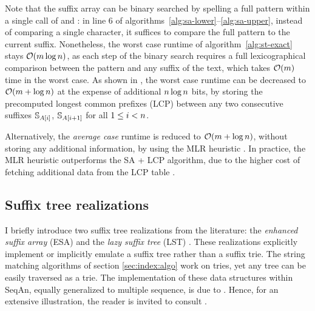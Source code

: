 Note that the suffix array can be binary searched by spelling a full pattern within a single call of  and : in line 6 of algorithms~\ref{alg:sa-lower}--\ref{alg:sa-upper}, instead of comparing a single character, it suffices to compare the full pattern to the current suffix.
Nonetheless, the worst case runtime of algorithm~\ref{alg:st-exact} stays $\mathcal{O}(m \log{n})$, as each step of the binary search requires a full lexicographical comparison between the pattern and any suffix of the text, which takes $\mathcal{O}(m)$ time in the worst case.
As shown in \citep{Manber1990}, the worst case runtime can be decreased to $\mathcal{O}(m + \log{n})$ at the expense of additional $n \log{n}$ bits, by storing the precomputed longest common prefixes (LCP) between any two consecutive suffixes ${\mathbb{S}}_{A[i]}$, ${\mathbb{S}}_{A[i+1]}$ for all $1 \leq i < n$.

Alternatively, the \emph{average case} runtime is reduced to $\mathcal{O}(m + \log{n})$, without storing any additional information, by using the MLR heuristic \citep{Manber1990}.
In practice, the MLR heuristic outperforms the SA + LCP algorithm, due to the higher cost of fetching additional data from the LCP table \citep{Weese2013}.


\subsection{Suffix tree realizations}
\label{sec:index:stree}

I briefly introduce two suffix tree realizations from the literature: the \emph{enhanced suffix array} (ESA) \citep{Abouelhoda2004} and the \emph{lazy suffix tree} (LST) \citep{Giegerich2003}.
These realizations explicitly implement or implicitly emulate a suffix tree rather than a suffix trie.
The string matching algorithms of section \ref{sec:index:algo} work on tries, yet any tree can be easily traversed as a trie.
The implementation of these data structures within SeqAn, equally generalized to multiple sequence, is due to \citeauthor{Weese2013}.
Hence, for an extensive illustration, the reader is invited to consult \citep{Weese2013}.

